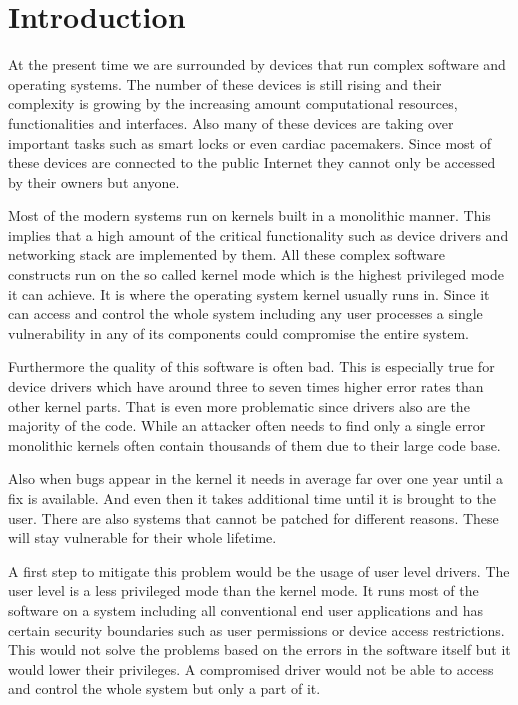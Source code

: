 \documentclass[
a4paper,
12pt,
notitlepage,
parskip=half,
DIV=11,
]{scrbook}
\begin{document}
	
	\tableofcontents
	
	\chapter{Introduction}
		
	
                At the present time we are surrounded by devices that run complex software and operating systems.
		The number of these devices is still rising and their complexity is growing by the increasing amount computational resources, functionalities and interfaces.
		Also many of these devices are taking over important tasks such as smart locks or even cardiac pacemakers.
		Since most of these devices are connected to the public Internet they cannot only be accessed by their owners but anyone.
		
		Most of the modern systems run on kernels built in a monolithic manner.
		This implies that a high amount of the critical functionality such as device drivers and networking stack are implemented by them.
		All these complex software constructs run on the so called kernel mode which is the highest privileged mode it can achieve.
		It is where the operating system kernel usually runs in.
		Since it can access and control the whole system including any user processes a single vulnerability in any of its components could compromise the entire system.
		
		Furthermore the quality of this software is often bad.
		This is especially true for device drivers which have around three to seven times higher error rates than other kernel parts.
		That is even more problematic since drivers also are the majority of the code.
		While an attacker often needs to find only a single error monolithic kernels often contain thousands of them due to their large code base.
		
		Also when bugs appear in the kernel it needs in average far over one year until a fix is available.
		And even then it takes additional time until it is brought to the user.
		There are also systems that cannot be patched for different reasons.
		These will stay vulnerable for their whole lifetime. \citep{Chou:SOSP:01}
		
		A first step to mitigate this problem would be the usage of user level drivers.
		The user level is a less privileged mode than the kernel mode.
		It runs most of the software on a system including all conventional end user applications and has certain security boundaries such as user permissions or device access restrictions.
		This would not solve the problems based on the errors in the software itself but it would lower their privileges.
		A compromised driver would not be able to access and control the whole system but only a part of it.
		
\end{document}
